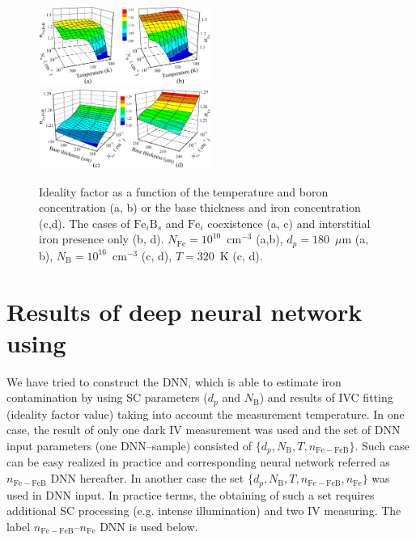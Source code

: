 \documentclass[journal]{IEEEtran}
\begin{document}
\begin{figure}[bt]
\centering
\includegraphics[width=0.5\textwidth]{Fig1a}
\includegraphics[width=0.5\textwidth]{Fig1b}
\caption{Ideality factor as a function of the temperature and boron concentration (a, b)
or the base thickness and iron concentration (c,d).
The cases of $\mathrm{Fe}_i\mathrm{B}_s$ and $\mathrm{Fe}_i$ coexistence (a, c)
and interstitial iron presence only (b, d).
$N_\mathrm{Fe}=10^{10}$~cm$^{-3}$ (a,b),
$d_p=180$~$\mu$m (a, b),
$N_\mathrm{B}=10^{16}$~cm$^{-3}$ (c, d),
$T=320$~K (c, d).
}
\label{fig_nValues}
\end{figure}


\section{Results of deep neural network using}

We have tried to construct the DNN, which is able to estimate iron contamination by using
SC parameters ($d_p$ and $N_\mathrm{B}$) and results of IVC fitting (ideality factor value)
taking into account the measurement temperature.
In one case, the result of only one dark IV measurement was used and the
set of DNN input parameters (one DNN--sample) consisted of $\{d_p,N_\mathrm{B},T,n_\mathrm{Fe-FeB}\}$.
Such case can be easy realized in practice
and corresponding neural network referred as $n_\mathrm{Fe-FeB}$ DNN hereafter.
In another case the set $\{d_p,N_\mathrm{B},T,n_\mathrm{Fe-FeB},n_\mathrm{Fe}\}$ was used in DNN input.
In practice terms, the obtaining of such a set requires additional SC processing (e.g. intense illumination) and two IV measuring.
The label $n_\mathrm{Fe-FeB}$--$n_\mathrm{Fe}$ DNN is used below.
\end{document}
